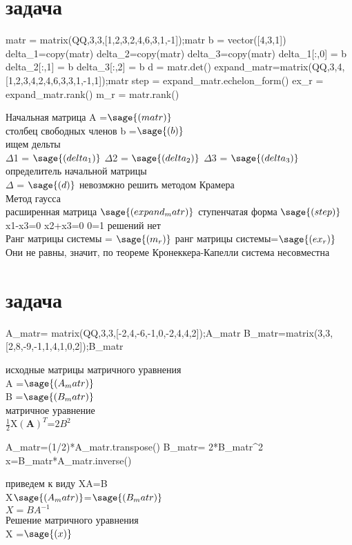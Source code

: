 \section{задача}
\begin {sagesilent}
matr = matrix(QQ,3,3,[1,2,3,2,4,6,3,1,-1]);matr
b = vector([4,3,1])
delta_1=copy(matr)
delta_2=copy(matr)
delta_3=copy(matr)
delta_1[:,0] = b
delta_2[:,1] = b
delta_3[:,2] = b
d = matr.det()
expand_matr=matrix(QQ,3,4,[1,2,3,4,2,4,6,3,3,1,-1,1]);matr
step = expand_matr.echelon_form()
ex_r = expand_matr.rank()
m_r = matr.rank()
\end {sagesilent}
Начальная матрица A =$\sage{(matr)}$\\
столбец свободных членов b =$\sage{(b)}$\\
ищем дельты\\
$\Delta$1 = $\sage{(delta_1)}$
$\Delta$2 = $\sage{(delta_2)}$
$\Delta$3 = $\sage{(delta_3)}$\\
определитель начальной матрицы\\
$\Delta$ = $\sage{(d)}$
невозмжно решить методом Крамера\\
Метод гаусса\\
расширенная матрица
$\sage{(expand_matr)}$
ступенчатая форма
$\sage{(step)}$
x1-x3=0
x2+x3=0
0=1
решений нет\\
Ранг матрицы системы = $\sage{(m_r)}$ ранг матрицы системы=$\sage{(ex_r)}$\\
Они не равны, значит, по теореме Кронеккера-Капелли система несовместна
\section{задача}
\begin {sagesilent}
A_matr= matrix(QQ,3,3,[-2,4,-6,-1,0,-2,4,4,2]);A_matr
B_matr=matrix(3,3,[2,8,-9,-1,1,4,1,0,2]);B_matr

\end{sagesilent}
исходные матрицы матричного уравнения\\
A =$\sage{(A_matr)}$\\
B =$\sage{(B_matr)}$\\
матричное уравнение\\
$\frac{1}{2}$X$\mathbf{(A)}^T$=$2B^2$\\
\begin {sagesilent}
A_matr=(1/2)*A_matr.transpose()
B_matr= 2*B_matr^2
x=B_matr*A_matr.inverse()
\end{sagesilent}
приведем к виду XA=B\\
X$\sage{(A_matr)}$=$\sage{(B_matr)}$\\
$X = B{A}^{-1}$\\
Решение матричного уравнения\\
X =$\sage{(x)}$
